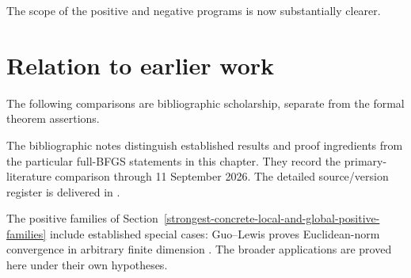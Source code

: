 The scope of the positive and negative programs is now substantially clearer.


\section*{Relation to earlier work}
The following comparisons are bibliographic scholarship, separate from the formal theorem assertions.

The bibliographic notes distinguish established results and proof ingredients from the particular full-BFGS statements in this chapter. They record the primary-literature comparison through 11 September 2026. The detailed source/version register is delivered in .

The positive families of Section~\ref{strongest-concrete-local-and-global-positive-families} include established special cases: Guo--Lewis proves Euclidean-norm convergence in arbitrary finite dimension \cite[Corollary 4.2]{GL18}. The broader applications are proved here under their own hypotheses.
